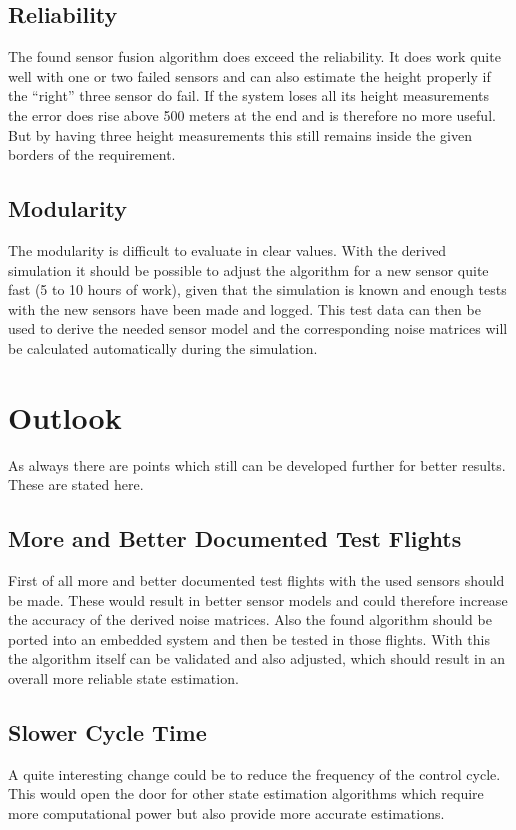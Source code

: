  \subsection{Reliability}
 The found sensor fusion algorithm does exceed the reliability.
 It does work quite well with one or two failed sensors and can also estimate the height properly if the ``right'' three sensor do fail.
 If the system loses all its height measurements the error does rise above 500 meters at the end and is therefore no more useful.
 But by having three height measurements this still remains inside the given borders of the requirement.

 \subsection{Modularity}
 The modularity is difficult to evaluate in clear values.
 With the derived simulation it should be possible to adjust the algorithm for a new sensor quite fast (5 to 10 hours of work),
 given that the simulation is known and enough tests with the new sensors have been made and logged.
 This test data can then be used to derive the needed sensor model and the corresponding noise matrices will be calculated automatically during the simulation.


\section{Outlook}
As always there are points which still can be developed further for better results. These are stated here.

\subsection{More and Better Documented Test Flights}
First of all more and better documented test flights with the used sensors should be made.
These would result in better sensor models and could therefore increase the accuracy of the derived noise matrices.
Also the found algorithm should be ported into an embedded system and then be tested in those flights.
With this the algorithm itself can be validated and also adjusted, which should result in an overall more reliable state estimation.

\subsection{Slower Cycle Time}
A quite interesting change could be to reduce the frequency of the control cycle.
This would open the door for other state estimation algorithms which require more computational power but also provide more accurate estimations.

